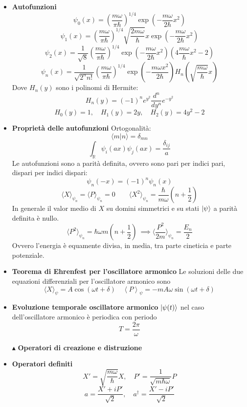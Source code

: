 \documentclass{book}
\newcommand{\g}{\textbf}
\newcommand{\e}{\begin{equation}}
\newcommand{\ex}{\end{equation} }
\renewcommand{\it}{\item[$\cdot$]}
\begin{document}
\begin{multicols}{4}
\begin{itemize}
    \it \g{Autofunzioni}
        \e{\psi_0(x) = \left(\frac{m\omega}{\pi\hbar}\right)^{1/4} \exp\left(-\frac{m\omega}{2\hbar}x^2\right)} \ex
        \e{\psi_1(x) = \left(\frac{m\omega}{\pi\hbar}\right)^{1/4} \sqrt{\frac{2m\omega}{\hbar}} x \exp\left(-\frac{m\omega}{2\hbar}x^2\right)} \ex
        \e{\psi_2(x) = \frac{1}{\sqrt{8}} \left(\frac{m\omega}{\pi\hbar}\right)^{1/4} \exp\left(-\frac{m\omega}{2\hbar}x^2\right)\left(4\frac{m\omega}{\hbar}x^2 - 2\right)} \ex
        \e{\psi_n(x) = \frac{1}{\sqrt{2^n n!}} \left(\frac{m\omega}{\pi\hbar}\right)^{1/4} \exp\left(-\frac{m\omega x^2}{2\hbar}\right) H_n\left(\sqrt{\frac{m\omega}{\hbar}} x\right)} \ex
        Dove $H_n(y)$ sono i polinomi di Hermite:
        \e{H_n(y) = (-1)^n e^{y^2} \frac{d^n}{dy^n} e^{-y^2}} \ex
        \e{H_0(y) = 1, \quad H_1(y) = 2y, \quad H_2(y) = 4y^2 - 2} \ex
        \it \g{Proprietà delle autofunzioni}
        Ortogonalità:
        \e{\langle m | n \rangle = \delta_{mn}} \ex
        \e{\int_{\mathbb{R}} \psi_i(ax) \psi_j(ax) = \frac{\delta_{ij}}{a}} \ex
     Le autofunzioni sono a parità definita, ovvero sono pari per indici pari, dispari per indici dispari:
     \e{\psi_{n}(-x) = (-1)^{n}\psi_{n}(x)}\ex
     \e{\langle X \rangle_{\psi_{n}} = \langle P \rangle_{\psi_{n}} = 0 \qquad \langle 
     X^{2}\rangle_{\psi_{n}} = \frac{\hbar}{m \omega}(n + \frac{1}{2})}\ex
     In generale il valor medio di $X$ su domini simmetrici e su stati $\ket{\psi}$ a parità definita è nullo.
     \e{\langle P^{2}\rangle_{\psi_{n}} = \hbar \omega m (n + \frac{1}{2}) \ \implies \langle \frac{P^{2}}{2m}\rangle_{\psi_{n}} = \frac{E_{n}}{2}}\ex
     Ovvero l'energia è equamente divisa, in media, tra parte cineticia e parte potenziale. 

     \it \g{Teorema di Ehrenfest per l'oscillatore armonico}
     Le soluzioni delle due equazioni differenziali per l'oscillatore armonico sono 
     \e{\langle X \rangle_{\psi} = A\cos(\omega t + \delta) \quad \left\langle P \right\rangle_{\psi} = - m A \omega \sin(\omega t + \delta)}\ex
     \it \g{Evoluzione temporale oscillatore armonico}
    $\ket{\psi(t)}$ nel caso dell'oscillatore armonico è periodica con periodo 
    \e{T = \frac{2 \pi}{\omega}}\ex
    
\item [$\blacktriangle$] \g{Operatori di creazione e distruzione}
    \it \g{Operatori definiti}
        \e{X' = \sqrt{\frac{m\omega}{\hbar}} X, \quad P' = \frac{1}{\sqrt{m\hbar\omega}} P} \ex
        \e{a = \frac{X' + iP'}{\sqrt{2}}, \quad a^\dagger = \frac{X' - iP'}{\sqrt{2}}} \ex


\end{itemize}
\end{multicols}
\end{document}
